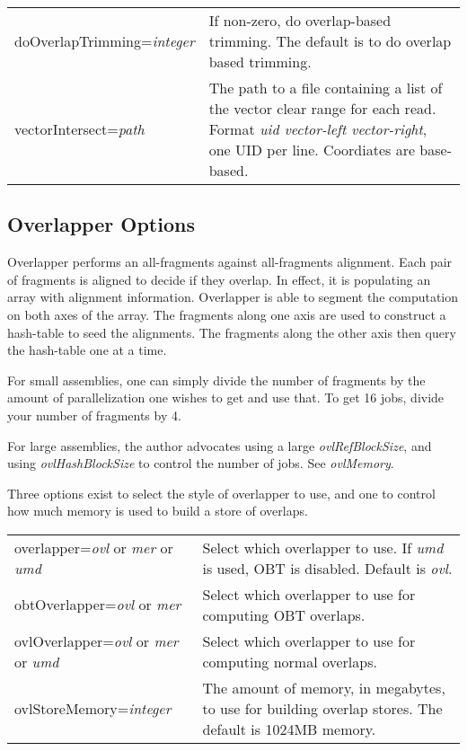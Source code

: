 \documentclass[twoside,11pt]{article}
\begin{document}
\begin{longtable}{lp{3.0in}}
doOverlapTrimming={\it integer} &
If non-zero, do overlap-based trimming.  The default is to do overlap
based trimming.
\\

vectorIntersect={\it path} &
The path to a file containing a list of the vector clear range for
each read.  Format {\it uid vector-left vector-right}, one UID per
line.  Coordiates are base-based.
\\

\end{longtable}


\subsection{Overlapper Options}
\label{sec:overlapopts}

Overlapper performs an all-fragments against all-fragments alignment.
Each pair of fragments is aligned to decide if they overlap.  In
effect, it is populating an array with alignment information.
Overlapper is able to segment the computation on both axes of the
array.  The fragments along one axis are used to construct a
hash-table to seed the alignments.  The fragments along the other axis
then query the hash-table one at a time.

For small assemblies, one can simply divide the number of fragments by
the amount of parallelization one wishes to get and use that.  To get
16 jobs, divide your number of fragments by 4.

For large assemblies, the author advocates using a large {\it
ovlRefBlockSize}, and using {\it ovlHashBlockSize} to control the number of
jobs.  See {\it ovlMemory}.

Three options exist to select the style of overlapper to use, and one to
control how much memory is used to build a store of overlaps.

\begin{longtable}{lp{3.0in}}
overlapper={\em ovl} or {\em mer} or {\em umd} &
Select which overlapper to use.
If {\em umd} is used, OBT is disabled.
Default is {\em ovl}.
\\

obtOverlapper={\em ovl} or {\em mer} &
Select which overlapper to use for computing OBT overlaps.
\\

ovlOverlapper={\em ovl} or {\em mer} or {\em umd} &
Select which overlapper to use for computing normal overlaps.
\\

ovlStoreMemory={\it integer} &
The amount of memory, in megabytes, to use for building overlap
stores.  The default is 1024MB memory.
\\
\end{longtable}
\end{document}
